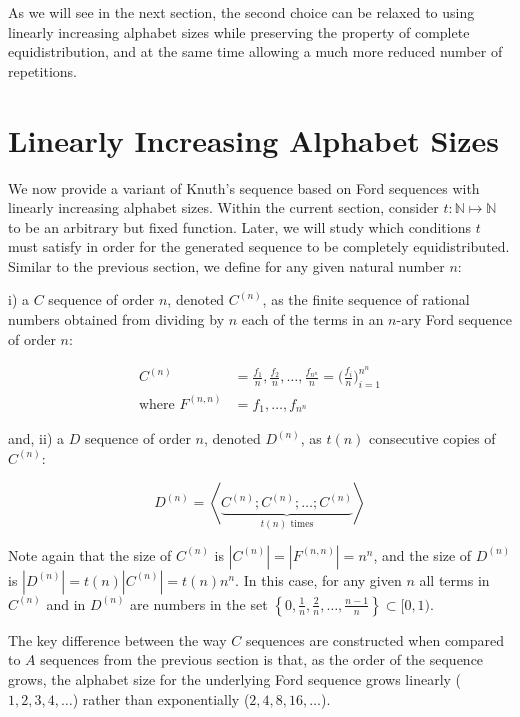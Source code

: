\documentclass[11pt,a4paper]{tesis}
\theoremstyle{plain}
\theoremstyle{definition}
\begin{document}
As we will see in the next section, the second choice can be relaxed to using linearly increasing alphabet sizes while preserving the property of complete equidistribution, and at the same time allowing a much more reduced number of repetitions.

\section{Linearly Increasing Alphabet Sizes}

We now provide a variant of Knuth's sequence based on Ford sequences with linearly increasing alphabet sizes. Within the current section, consider $t : \mathbb{N} \mapsto \mathbb{N}$ to be an arbitrary but fixed function. Later, we will study which conditions $t$ must satisfy in order for the generated sequence to be completely equidistributed. Similar to the previous section, we define for any given natural number $n$:

i) a $C$ sequence of order $n$, denoted $C^{(n)}$, as the finite sequence of rational numbers obtained from dividing by $n$ each of the terms in an $n$-ary Ford sequence of order $n$:

\begin{equation*}
  \begin{aligned}
    C^{(n)} & = \frac{f_1}{n}, \frac{f_2}{n}, \dots, \frac{f_{n^n}}{n} = \bigg( \frac{f_i}{n} \bigg)_{i = 1}^{n^n} \\
    \text{where } F^{(n, n)} & = f_1, \dots, f_{n^n}
  \end{aligned}
\end{equation*}

and, ii) a $D$ sequence of order $n$, denoted $D^{(n)}$, as $t(n)$ consecutive copies of $C^{(n)}$:

\begin{equation*}
  D^{(n)} = \left< \underbrace{C^{(n)} ; C^{(n)} ; \dots ; C^{(n)}}_{t(n) \text{ times}} \right>
\end{equation*}

Note again that the size of $C^{(n)}$ is $|C^{(n)}| = |F^{(n, n)}| = n^n$, and the size of $D^{(n)}$ is $|D^{(n)}| = t(n) |C^{(n)}| = t(n) n^n$. In this case, for any given $n$ all terms in $C^{(n)}$ and in $D^{(n)}$ are numbers in the set $\left \{ 0, \frac{1}{n}, \frac{2}{n}, \dots, \frac{n - 1}{n} \right \} \subset [0, 1)$.

The key difference between the way $C$ sequences are constructed when compared to $A$ sequences from the previous section is that, as the order of the sequence grows, the alphabet size for the underlying Ford sequence grows linearly ($1, 2, 3, 4, \dots$) rather than exponentially ($2, 4, 8, 16, \dots$).
\end{document}
